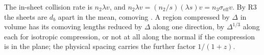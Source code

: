 The in-sheet collision rate is $n_{2}\lambda v$, and $n_{2}\lambda v = (n_{2}/s)(\lambda s)v = n_{3}\sigma_{\mathrm{eff}}v$. By R3 the sheets are $d_{b}$ apart in the mean, comoving \cite[Prem.~7.4]{ButlerT14}. A region compressed by $\Delta$ in volume has its comoving lengths reduced by $\Delta$ along one direction, by $\Delta^{1/3}$ along each for isotropic compression, or not at all along the normal if the compression is in the plane; the physical spacing carries the further factor $1/(1+z)$.
